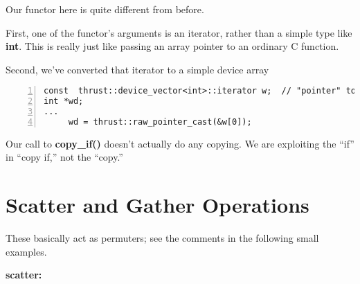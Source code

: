Our functor here is quite different from before.

First, one of the functor's arguments is an iterator, rather than a
simple type like {\bf int}.  This is really just like passing an array
pointer to an ordinary C function.

Second, we've converted that iterator to a simple device array

\begin{lstlisting}[numbers=left]
const  thrust::device_vector<int>::iterator w;  // "pointer" to our array
int *wd;
...
     wd = thrust::raw_pointer_cast(&w[0]);
\end{lstlisting}

% 


Our call to {\bf copy\_if()} doesn't actually do any copying.  We are
exploiting the ``if'' in ``copy if,'' not the ``copy.''

% 
% 
% 
% 
\section{Scatter and Gather Operations}

These basically act as permuters; see the comments in the following
small examples.

{\bf scatter:}

